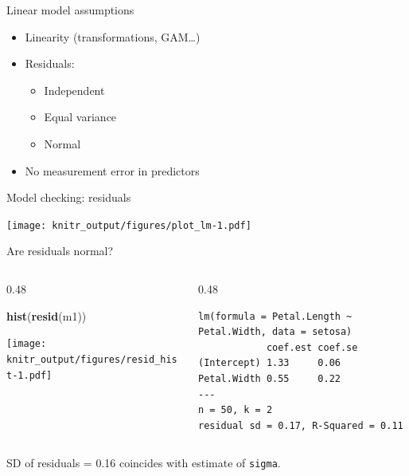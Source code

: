 \documentclass[10pt,ignorenonframetext,]{beamer}
\newenvironment{Shaded}{\begin{snugshade}}{\end{snugshade}}
\newcommand{\KeywordTok}[1]{\textcolor[rgb]{0.13,0.29,0.53}{\textbf{{#1}}}}
\newcommand{\NormalTok}[1]{{#1}}
\providecommand{\tightlist}{%
\setlength{\itemsep}{0pt}\setlength{\parskip}{0pt}}
\def\begincols{\begin{columns}[c]}
\def\endcols{\end{columns}}
\def\begincol{\begin{column}{0.48\textwidth}}
\def\endcol{\end{column}}
\begin{document}
\begin{frame}{Linear model assumptions}

\begin{itemize}[<+->]
\item
  Linearity (transformations, GAM\ldots{})
\item
  Residuals:

  \begin{itemize}[<+->]
  \tightlist
  \item
    Independent
  \item
    Equal variance
  \item
    Normal
  \end{itemize}
\item
  No measurement error in predictors
\end{itemize}

\end{frame}

\begin{frame}{Model checking: residuals}

\texttt{[image: knitr\_output/figures/plot\_lm-1.pdf]}

\end{frame}

\begin{frame}[fragile]{Are residuals normal?}

\begincols

\begincol

\begin{Shaded}
\begin{Highlighting}[]
\KeywordTok{hist}\NormalTok{(}\KeywordTok{resid}\NormalTok{(m1))}
\end{Highlighting}
\end{Shaded}

\texttt{[image: knitr\_output/figures/resid\_hist-1.pdf]} \endcol

\begincol

\begin{verbatim}
lm(formula = Petal.Length ~ Petal.Width, data = setosa)
            coef.est coef.se
(Intercept) 1.33     0.06   
Petal.Width 0.55     0.22   
---
n = 50, k = 2
residual sd = 0.17, R-Squared = 0.11
\end{verbatim}

\endcol

\endcols

SD of residuals = 0.16 coincides with estimate of \texttt{sigma}.

\end{frame}
\end{document}
